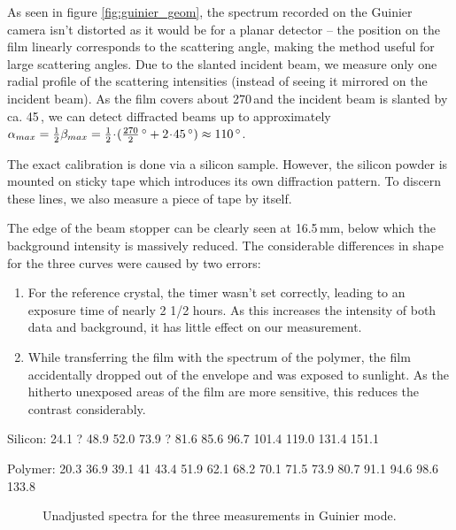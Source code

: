 As seen in figure \ref{fig:guinier_geom}, the spectrum recorded on the Guinier camera isn't distorted as it would be for a planar detector -- the position on the film linearly corresponds to the scattering angle, making the method useful for large scattering angles. Due to the slanted incident beam, we measure only one radial profile of the scattering intensities (instead of seeing it mirrored on the incident beam). As the film covers about 270\,\degree and the incident beam is slanted by ca. 45\,\degree, we can detect diffracted beams up to approximately $\alpha_{max} =\tfrac12 \beta_{max} = \tfrac12 \!\cdot\! (\tfrac{270}{2}\,\degree + 2 \!\cdot\! 45\,\degree) \approx 110\,\degree$.

The exact calibration is done via a silicon sample. However, the silicon powder is mounted on sticky tape which introduces its own diffraction pattern. To discern these lines, we also measure a piece of tape by itself.




The edge of the beam stopper can be clearly seen at 16.5\,mm, below which the background intensity is massively reduced. The considerable differences in shape for the three curves were caused by two errors:
\begin{enumerate}
\item
For the reference crystal, the timer wasn't set correctly, leading to an exposure time of nearly 2 1/2 hours. As this increases the intensity of both data and background, it has little effect on our measurement.
\item
While transferring the film with the spectrum of the polymer, the film accidentally dropped out of the envelope and was exposed to sunlight. As the hitherto unexposed areas of the film are more sensitive, this reduces the contrast considerably.
\end{enumerate}



Silicon:
24.1 ?
48.9
52.0
73.9 ?
81.6
85.6
96.7
101.4
119.0
131.4
151.1



Polymer:
20.3
36.9
39.1
41
43.4
51.9
62.1
68.2
70.1
71.5
73.9
80.7
91.1
94.6
98.6
133.8









\begin{figure}[h]
	\centering
	\def\svgwidth{0.5\textwidth}
	
	\caption{Unadjusted spectra for the three measurements in Guinier mode.}
	\label{fig:guinier_spec}
\end{figure}
